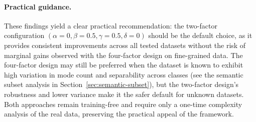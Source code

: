 \paragraph{Practical guidance.}
These findings yield a clear practical recommendation: the two-factor configuration $(\alpha{=}0, \beta{=}0.5, \gamma{=}0.5, \delta{=}0)$ should be the default choice, as it provides consistent improvements across all tested datasets without the risk of marginal gains observed with the four-factor design on fine-grained data. The four-factor design may still be preferred when the dataset is known to exhibit high variation in mode count and separability across classes (see the semantic subset analysis in Section~\ref{sec:semantic-subset}), but the two-factor design's robustness and lower variance make it the safer default for unknown datasets. Both approaches remain training-free and require only a one-time complexity analysis of the real data, preserving the practical appeal of the \ags{} framework.
